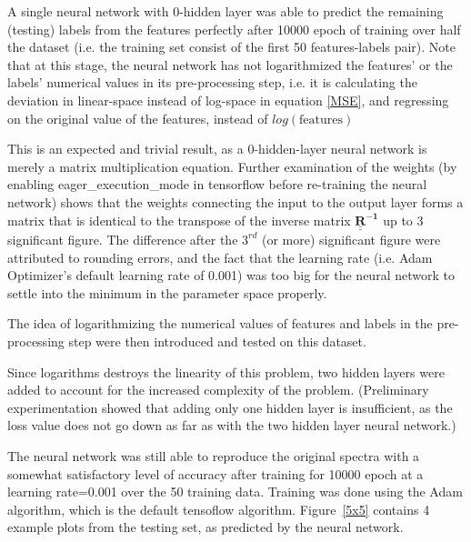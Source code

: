 \documentclass[a4paper, 12pt]{article}
\begin{document}
A single neural network with 0-hidden layer was able to predict the remaining (testing) labels from the features perfectly after 10000 epoch of training over half the dataset (i.e. the training set consist of the first 50 features-labels pair). Note that at this stage, the neural network has not logarithmized the features' or the labels' numerical values in its pre-processing step, i.e. it is calculating the deviation in linear-space instead of log-space in equation \ref{MSE}, and regressing on the original value of the features, instead of $log(\text{features})$

This is an expected and trivial result, as a 0-hidden-layer neural network is merely a matrix multiplication equation. Further examination of the weights (by enabling eager\_execution\_mode in tensorflow before re-training the neural network) shows that the weights connecting the input to the output layer forms a matrix that is identical to the transpose of the inverse matrix $\mathbf{\underline{\underline{R}}^{-1}}$ up to 3 significant figure. The difference after the $3^{rd}$ (or more) significant figure were attributed to rounding errors, and the fact that the learning rate (i.e. Adam Optimizer's default learning rate of 0.001) was too big for the neural network to settle into the minimum in the parameter space properly.

The idea of logarithmizing the numerical values of features and labels in the pre-processing step were then introduced and tested on this dataset.

Since logarithms destroys the linearity of this problem, two hidden layers were added to account for the increased complexity of the problem. (Preliminary experimentation showed that adding only one hidden layer is insufficient, as the loss value does not go down as far as with the two hidden layer neural network.)

The neural network was still able to reproduce the original spectra with a somewhat satisfactory level of accuracy after training for 10000 epoch at a learning rate=0.001 over the 50 training data. Training was done using the Adam algorithm, which is the default tensoflow algorithm. Figure~\ref{5x5} contains 4 example plots from the testing set, as predicted by the neural network.
\end{document}
